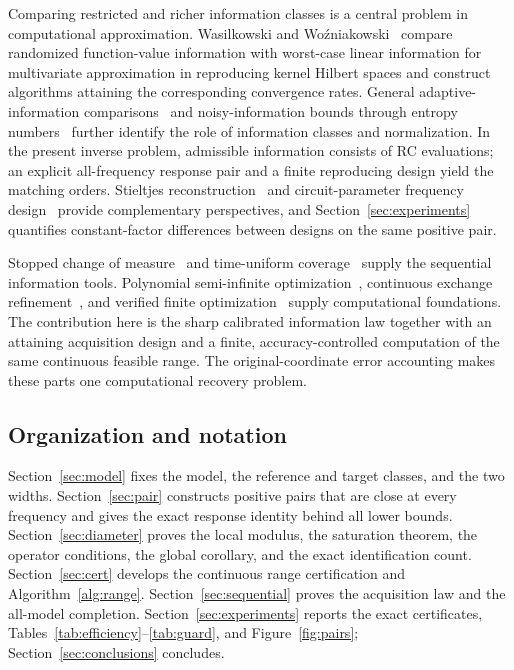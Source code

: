 \documentclass[10pt]{amsart}
\theoremstyle{definition}
\theoremstyle{remark}
\theoremstyle{plain}
\begin{document}
Comparing restricted and richer information classes is a central problem in computational approximation. Wasilkowski and Wo\'zniakowski~\cite{wasilwoz} compare randomized function-value information with worst-case linear information for multivariate approximation in reproducing kernel Hilbert spaces and construct algorithms attaining the corresponding convergence rates. General adaptive-information comparisons~\cite{knu} and noisy-information bounds through entropy numbers~\cite{knpu} further identify the role of information classes and normalization. In the present inverse problem, admissible information consists of RC evaluations; an explicit all-frequency response pair and a finite reproducing design yield the matching orders. Stieltjes reconstruction~\cite{grabovsky} and circuit-parameter frequency design~\cite{sovljanski} provide complementary perspectives, and Section~\ref{sec:experiments} quantifies constant-factor differences between designs on the same positive pair.

Stopped change of measure~\cite{castro,kaufmann,garivier} and time-uniform coverage~\cite{howard} supply the sequential information tools. Polynomial semi-infinite optimization~\cite{papp}, continuous exchange refinement~\cite{grid}, and verified finite optimization~\cite{jansson,schmid} supply computational foundations. The contribution here is the sharp calibrated information law together with an attaining acquisition design and a finite, accuracy-controlled computation of the same continuous feasible range. The original-coordinate error accounting makes these parts one computational recovery problem.

\subsection{Organization and notation}
Section~\ref{sec:model} fixes the model, the reference and target classes, and the two widths. Section~\ref{sec:pair} constructs positive pairs that are close at every frequency and gives the exact response identity behind all lower bounds. Section~\ref{sec:diameter} proves the local modulus, the saturation theorem, the operator conditions, the global corollary, and the exact identification count. Section~\ref{sec:cert} develops the continuous range certification and Algorithm~\ref{alg:range}. Section~\ref{sec:sequential} proves the acquisition law and the all-model completion. Section~\ref{sec:experiments} reports the exact certificates, Tables~\ref{tab:efficiency}--\ref{tab:guard}, and Figure~\ref{fig:pairs}; Section~\ref{sec:conclusions} concludes.
\end{document}
